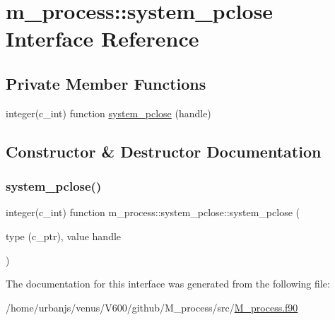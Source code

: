 \hypertarget{interfacem__process_1_1system__pclose}{}\section{m\+\_\+process\+:\+:system\+\_\+pclose Interface Reference}
\label{interfacem__process_1_1system__pclose}
\subsection*{Private Member Functions}
\begin{DoxyCompactItemize}
\item 
integer(c\+\_\+int) function \mbox{\hyperlink{interfacem__process_1_1system__pclose_a8484cc191f8a18e155f97e284c3795ab}{system\+\_\+pclose}} (handle)
\end{DoxyCompactItemize}


\subsection{Constructor \& Destructor Documentation}
\mbox{\label{interfacem__process_1_1system__pclose_a8484cc191f8a18e155f97e284c3795ab}} 
\subsubsection{\texorpdfstring{system\+\_\+pclose()}{system\_pclose()}}
{\footnotesize\ttfamily integer(c\+\_\+int) function m\+\_\+process\+::system\+\_\+pclose\+::system\+\_\+pclose (\begin{DoxyParamCaption}\item[{type (c\+\_\+ptr), value}]{handle }\end{DoxyParamCaption})\hspace{0.3cm}{\ttfamily [private]}}



The documentation for this interface was generated from the following file\+:\begin{DoxyCompactItemize}
\item 
/home/urbanjs/venus/\+V600/github/\+M\+\_\+process/src/\mbox{\hyperlink{M__process_8f90}{M\+\_\+process.\+f90}}\end{DoxyCompactItemize}
